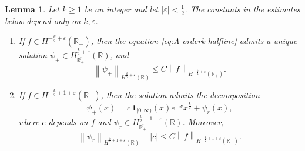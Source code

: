 \documentclass[11pt,reqno]{amsart}
\theoremstyle{plain}
\newtheorem{lemma}[theorem]{Lemma}
\theoremstyle{definition}
\numberwithin{equation}{section}
\newcommand{\norm}[1]{\left\lVert #1 \right\rVert}
\newcommand{\R}{\mathbb{R}}
\begin{document}
\begin{lemma}\label{lem:A-orderk-halfline}
Let $k\ge 1$ be an integer and let $|\varepsilon|<\frac12$.
The constants in the estimates below depend only on $k,\varepsilon$.
\begin{enumerate}
    \item If $f\in H^{-\frac{k}{2}+\varepsilon}(\R_+)$, then the equation
    \eqref{eq:A-orderk-halfline} admits a unique solution
    $\psi_+\in H^{\frac{k}{2}+\varepsilon}_{\overline{\R_+}}(\R)$, and
    \begin{equation}
        \norm{\psi_+}_{H^{\frac{k}{2}+\varepsilon}(\R)}
        \le C \norm{f}_{H^{-\frac{k}{2}+\varepsilon}(\R_+)}.
    \end{equation}
    \item If $f\in H^{-\frac{k}{2}+1+\varepsilon}(\R_+)$, then the solution admits the decomposition
    \begin{equation}
        \psi_+(x)
        = c\,\mathbf1_{[0,\infty)}(x)e^{-x}x^{\frac{k}{2}} + \psi_r(x),
    \end{equation}
    where $c$ depends on $f$ and
    $\psi_r\in H^{\frac{k}{2}+1+\varepsilon}_{\overline{\R_+}}(\R)$. Moreover,
    \begin{equation}
        \norm{\psi_r}_{H^{\frac{k}{2}+1+\varepsilon}(\R)}
        + |c|
        \le C \norm{f}_{H^{-\frac{k}{2}+1+\varepsilon}(\R_+)}.
    \end{equation}
\end{enumerate}
\end{lemma}
\end{document}

